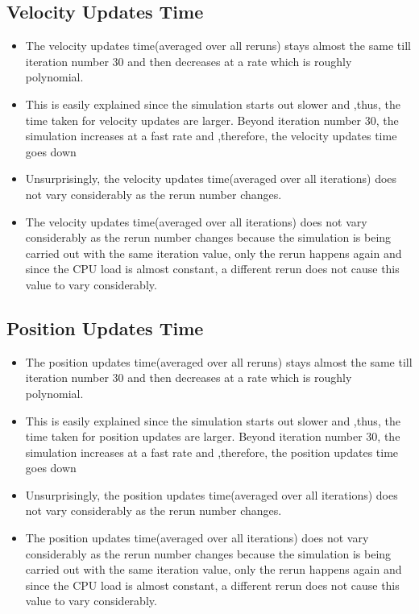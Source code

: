 \documentclass[11pt]{article}
\begin{document}
	
\subsection{Velocity Updates Time}
	\begin{itemize}
		\item The velocity updates time(averaged over all reruns) stays almost the same till iteration number 30 and then decreases at a rate which is roughly polynomial.
		\item This is easily explained since the simulation starts out slower and ,thus, the time taken for velocity updates are larger. Beyond iteration number 30, the simulation increases at a fast rate and ,therefore, the velocity updates time goes down
		\item Unsurprisingly, the velocity updates time(averaged over all iterations) does not vary considerably as the rerun number changes.
		\item The velocity updates time(averaged over all iterations) does not vary considerably as the rerun number changes because the simulation is being carried out with the same iteration value, only the rerun happens again and since the CPU load is almost constant, a different rerun does not cause this value to vary considerably.
	\end{itemize}

\subsection{Position Updates Time}
	\begin{itemize}
		\item The position updates time(averaged over all reruns) stays almost the same till iteration number 30 and then decreases at a rate which is roughly polynomial.
		\item This is easily explained since the simulation starts out slower and ,thus, the time taken for position updates are larger. Beyond iteration number 30, the simulation increases at a fast rate and ,therefore, the position updates time goes down
		\item Unsurprisingly, the position updates time(averaged over all iterations) does not vary considerably as the rerun number changes.
		\item The position updates time(averaged over all iterations) does not vary considerably as the rerun number changes because the simulation is being carried out with the same iteration value, only the rerun happens again and since the CPU load is almost constant, a different rerun does not cause this value to vary considerably.
	\end{itemize}
\end{document}

